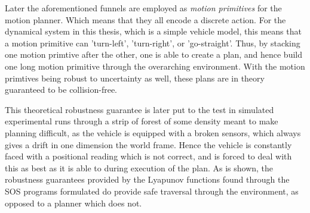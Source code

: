   Later the aforementioned funnels are employed as \textit{motion primitives}
  for the motion planner. Which means that they all encode a discrete action.
  For the dynamical system in this thesis, which is a simple vehicle model, this
  means that a motion primitive can 'turn-left', 'turn-right', or 'go-straight'.
  Thus, by stacking one motion primtive after the other, one is able to create a
  plan, and hence build one long motion primitive through the overarching
  environment. With the motion primtives being robust to uncertainty as well,
  these plans are in theory guaranteed to be collision-free.

  This theoretical robustness guarantee is later put to the test in simulated
  experimental runs through a strip of forest of some density meant to make
  planning difficult, as the vehicle is equipped with a broken sensors, which
  always gives a drift in one dimension the world frame. Hence the vehicle is
  constantly faced with a positional reading which is not correct, and is forced
  to deal with this as best as it is able to during execution of the plan. As is
  shown, the robustness guarantees provided by the Lyapunov functions found
  through the \ac{SOS} programs formulated do provide safe traversal through the
  environment, as opposed to a planner which does not.


